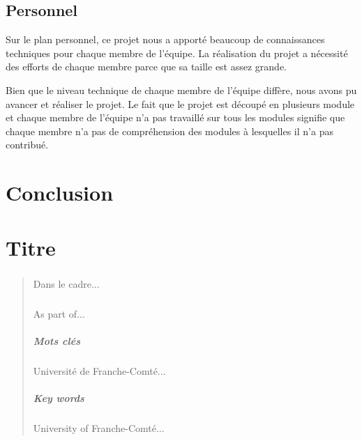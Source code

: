 \documentclass[a4paper,12pt]{report}
\begin{document}
\section{Personnel}
Sur le plan personnel, ce projet nous a apporté beaucoup de connaissances techniques pour chaque membre de l'équipe. La réalisation du projet a nécessité des efforts de chaque membre parce que sa taille est assez grande. 

Bien que le niveau technique de chaque membre de l'équipe diffère, nous avons pu avancer et réaliser le projet. Le fait que le projet est découpé en plusieurs module et chaque membre de l'équipe n'a pas travaillé sur tous les modules signifie que chaque membre n'a pas de compréhension des modules à lesquelles il n'a pas contribué.

\chapter*{Conclusion}

\appendix

\chapter{Titre}

\newpage

\listoffigures

\begin{abstract}
\paragraph{}
Dans le cadre...
\paragraph{}
As part of...
\paragraph{Mots clés}
Université de Franche-Comté...
\paragraph{Key words}
University of Franche-Comté...
\end{abstract}
\end{document}
